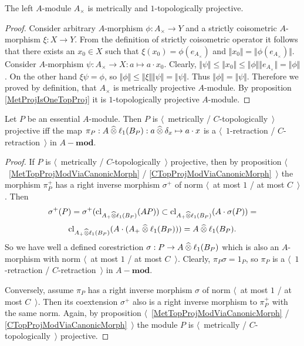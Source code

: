 \begin{proposition}\label{UnitalAlgIsMetTopProj} The left $A$-module $A_\times$ is metrically and $1$-topologically projective.
\end{proposition} 
\begin{proof} Consider arbitrary $A$-morphism $\phi:A_\times\to Y$ and a strictly coisometric $A$-morphism $\xi:X\to Y$. From the definition of strictly coisometric operator it follows that there exists an $x_0\in X$ such that $\xi(x_0)=\phi(e_{A_\times})$ and $\Vert x_0\Vert=\Vert\phi(e_{A_\times})\Vert$. Consider $A$-morphism $\psi:A_\times\to X:a\mapsto a\cdot x_0$. Clearly, $\Vert\psi\Vert\leq\Vert x_0\Vert\leq\Vert\phi\Vert\Vert e_{A_\times}\Vert=\Vert\phi\Vert$. On the other hand $\xi\psi=\phi$, so $\Vert\phi\Vert\leq\Vert\xi\Vert\Vert\psi\Vert=\Vert\psi\Vert$. Thus $\Vert\phi\Vert=\Vert\psi\Vert$. Therefore we proved by definition, that $A_\times$ is metrically projective $A$-module. By proposition \ref{MetProjIsOneTopProj} it is $1$-topologically projective $A$-module.
\end{proof}

\begin{proposition}\label{NonDegenMetTopProjCharac}  Let $P$ be an essential $A$-module. Then $P$ is $\langle$~metrically / $C$-topologically~$\rangle$ projective iff the map $\pi_P:A\mathbin{\widehat{\otimes}}\ell_1(B_P):a\mathbin{\widehat{\otimes}}\delta_x\mapsto a\cdot x$ is a $\langle$~$1$-retraction / $C$-retraction~$\rangle$ in $A-\mathbf{mod}$.
\end{proposition} 
\begin{proof}
If $P$ is $\langle$~metrically / $C$-topologically~$\rangle$ projective, then by proposition $\langle$~\ref{MetTopProjModViaCanonicMorph} / \ref{CTopProjModViaCanonicMorph}~$\rangle$ the morphism $\pi_P^+$ has a right inverse morphism $\sigma^+$ of norm $\langle$~at most $1$ / at most $C$~$\rangle$. Then 
$$
	\sigma^+(P)=\sigma^+(\operatorname{cl}_{A_+\mathbin{\widehat{\otimes}}\ell_1(B_P)}(AP))\subset \operatorname{cl}_{A_+\mathbin{\widehat{\otimes}}\ell_1(B_P)}(A\cdot\sigma(P))=
$$
$$\operatorname{cl}_{A_+\mathbin{\widehat{\otimes}}\ell_1(B_P)}(A\cdot(A_+\mathbin{\widehat{\otimes}}\ell_1(B_P)))=A\mathbin{\widehat{\otimes}}\ell_1(B_P).
$$ 
So we have well a defined corestriction $\sigma:P\to A\mathbin{\widehat{\otimes}}\ell_1(B_P)$ which is also an $A$-morphism with norm $\langle$~at most $1$ / at most $C$~$\rangle$. Clearly, $\pi_P\sigma=1_P$, so $\pi_P$ is a $\langle$~$1$-retraction / $C$-retraction~$\rangle$ in $A-\mathbf{mod}$.

Conversely, assume $\pi_P$ has a right inverse morphism $\sigma$ of norm $\langle$~at most $1$ / at most $C$~$\rangle$. Then its coextension $\sigma^+$ also is a right inverse morphism to $\pi_P^+$ with the same norm. Again, by proposition $\langle$~\ref{MetTopProjModViaCanonicMorph} / \ref{CTopProjModViaCanonicMorph}~$\rangle$ the module $P$ is $\langle$~metrically / $C$-topologically~$\rangle$ projective. 
\end{proof}

